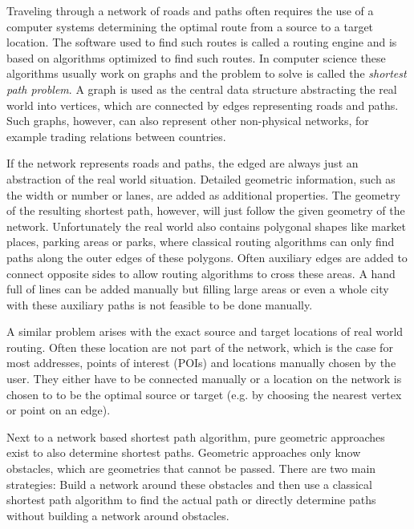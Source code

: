 
Traveling through a network of roads and paths often requires the use of a computer systems determining the optimal route from a source to a target location.
The software used to find such routes is called a routing engine and is based on algorithms optimized to find such routes.
In computer science these algorithms usually work on graphs and the problem to solve is called the \textit{shortest path problem}.
A graph is used as the central data structure abstracting the real world into vertices, which are connected by edges representing roads and paths.
Such graphs, however, can also represent other non-physical networks, for example trading relations between countries\citationNeeded.

If the network represents roads and paths, the edged are always just an abstraction of the real world situation.
Detailed geometric information, such as the width or number or lanes, are added as additional properties.
The geometry of the resulting shortest path, however, will just follow the given geometry of the network.
Unfortunately the real world also contains polygonal shapes like market places, parking areas or parks, where classical routing algorithms can only find paths along the outer edges of these polygons.
Often auxiliary edges are added to connect opposite sides to allow routing algorithms to cross these areas.
A hand full of lines can be added manually but filling large areas or even a whole city with these auxiliary paths is not feasible to be done manually.

A similar problem arises with the exact source and target locations of real world routing.
Often these location are not part of the network, which is the case for most addresses, points of interest (POIs) and locations manually chosen by the user.
They either have to be connected manually or a location on the network is chosen to to be the optimal source or target (e.g. by choosing the nearest  vertex or point on an edge).

Next to a network based shortest path algorithm, pure geometric approaches exist to also determine shortest paths.
Geometric approaches only know obstacles, which are geometries that cannot be passed.
There are two main strategies\citationNeeded:
Build a network around these obstacles and then use a classical shortest path algorithm to find the actual path or directly determine paths without building a network around obstacles.

